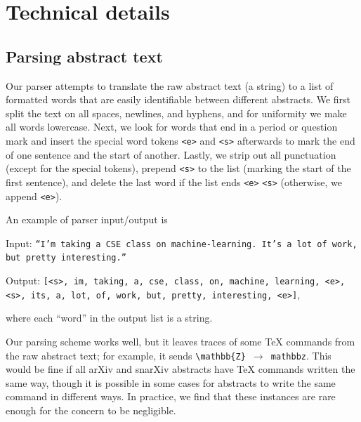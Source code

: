 \documentclass{article}
\begin{document}





\appendix
\section{Technical details} \label{app:details}
\subsection{Parsing abstract text} \label{app:parsing}
Our parser attempts to translate the raw abstract text (a string) to a list of formatted words that are easily identifiable between different abstracts.
We first split the text on all spaces, newlines, and hyphens, and for uniformity we make all words lowercase.
Next, we look for words that end in a period or question mark and insert the special word tokens \texttt{<e>} and \texttt{<s>} afterwards to mark the end of one sentence and the start of another.
Lastly, we strip out all punctuation (except for the special tokens), prepend \texttt{<s>} to the list (marking the start of the first sentence), and delete the last word if the list ends \texttt{<e>} \texttt{<s>} (otherwise, we append \texttt{<e>}).

An example of parser input/output is

Input: \texttt{``I'm taking a CSE class on machine-learning.\ It's a lot of work, but pretty interesting.''}

Output: \texttt{[<s>, im, taking, a, cse, class, on, machine, learning, <e>, <s>, its, a, lot, of, work, but, pretty, interesting, <e>]}, 

where each ``word'' in the output list is a string.

Our parsing scheme works well, but it leaves traces of some TeX commands from the raw abstract text; for example, it sends \texttt{\textbackslash mathbb\{Z\} $\to$ mathbbz}.
This would be fine if all arXiv and snarXiv abstracts have TeX commands written the same way, though it is possible in some cases for abstracts to write the same command in different ways. In practice, we find that these instances are rare enough for the concern to be negligible.
\end{document}
